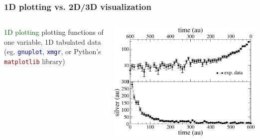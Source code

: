 \begin{frame}
\frametitle{1D plotting vs. 2D/3D visualization}

\begin{columns}
\begin{column}{7cm}
\begin{beamerboxesrounded}[upper=block head,lower=block body,shadow=true]{\textcolor{DarkBlue}{} \textcolor{DarkGreen}{1D plotting}}
         plotting functions of one variable, 1D tabulated data (eg. \textcolor{DarkBlue}{\tt gnuplot},  \textcolor{DarkBlue}{\tt xmgr}, or Python's \textcolor{DarkRed}{\tt matplotlib} library)
\end{beamerboxesrounded}
\end{column}
\begin{column}{5cm}
        \centering
        \includegraphics[width=.85\columnwidth]{figs/plots/others/silver_2plots}
\end{column}
\end{columns}


\end{frame}
